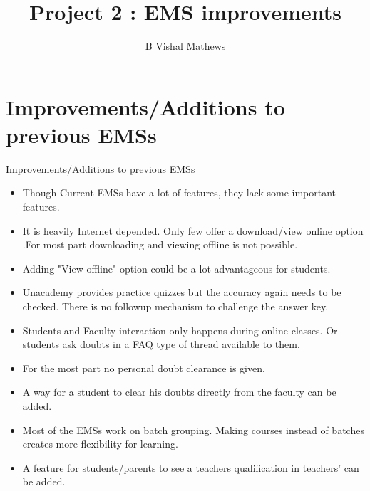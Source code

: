 \documentclass{beamer}
\begin{document}
\newcommand{\bfr}[2]{\section{#1} \begin{frame}{#1} #2 \end{frame}}

	\title{Project 2 : EMS improvements}
		\author{B Vishal Mathews}

	\begin{frame}
    		\titlepage 
	\end{frame}
	
	\begin{frame}
		\tableofcontents
	\end{frame}

\bfr{Improvements/Additions to previous EMSs}{

    \begin{itemize}
        \item Though Current EMSs have a lot of features, they lack some important features. 
        \item It is heavily Internet depended. Only few offer a download/view online option .For most part downloading and viewing offline is not possible. 
        \item Adding "View offline" option could be a lot advantageous for students.
        \item Unacademy provides practice quizzes but the accuracy again needs to be checked. There is no followup mechanism to challenge the answer key.
    \end{itemize}
        
}
        
\begin{frame}
        \begin{itemize}
        \item Students and Faculty interaction only happens during online classes. Or students ask doubts in a FAQ type of thread available to them.
        \item For the most part no personal doubt clearance is given. 
        \item A way for a student to clear his doubts directly from the faculty can be added.
        \item Most of the EMSs work on batch grouping. Making courses instead of batches creates more flexibility for learning.
        \item A feature for students/parents to see a teachers qualification in teachers' can be added.
        
    \end{itemize}
    
\end{frame}
\end{document}
